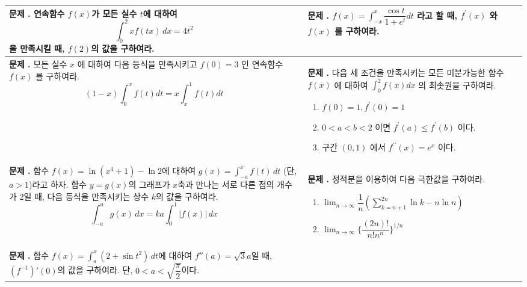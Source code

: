 \documentclass[10pt, a4paper]{article}
\newcounter{probcount}
\newcommand{\exercise}[1]{%
    \stepcounter{probcount}%
    \begin{minipage}[t][120mm][t]{0.44\textwidth}
        \small 
        \vspace{1mm}
        \noindent \textbf{문제 \arabic{probcount}.} #1
    \end{minipage}%
}
\begin{document}
\noindent
\begin{longtable}{p{} | p{}}
    
    \exercise{연속함수 $f(x)$가 모든 실수 $t$에 대하여 
\[ \int_{0}^{2} x f(tx) \, dx = 4t^2 \]
을 만족시킬 때, $f(2)$의 값을 구하여라.} 
    & 
    \exercise{$f(x) = \displaystyle \int_{-x}^{x} \dfrac{\cos t}{1+e^t} dt$ 라고 할 때, $f^{\prime}(x)$ 와 $f(x)$ 를 구하여라.} \\
    \hline 
    
    \exercise{모든 실수 $x$ 에 대하여 다음 등식을 만족시키고 $f(0)=3$ 인 연속함수 $f(x)$ 를 구하여라.
    \[ (1-x) \int_0^x f(t) dt = x \int_x^1 f(t) dt \]} 
    & 

    \exercise{다음 세 조건을 만족시키는 모든 미분가능한 함수 $f(x)$ 에 대하여 $\displaystyle \int_0^2 f(x) dx$ 의 최솟원을 구하여라.
    \begin{enumerate}[label=(\roman*), nosep]
        \item $f(0)=1, f^{\prime}(0)=1$
        \item $0 < a < b < 2$ 이면 $f^{\prime}(a) \le f^{\prime}(b)$ 이다.
        \item 구간 $(0, 1)$ 에서 $f^{\prime\prime}(x) = e^x$ 이다.
    \end{enumerate}} \\
    
    \exercise{함수 $f(x) = \ln(x^4 + 1) - \ln 2$에 대하여 $g(x) = \int_{-a}^{x} f(t) \, dt$ (단, $a > 1$)라고 하자. 함수 $y = g(x)$의 그래프가 $x$축과 만나는 서로 다른 점의 개수가 2일 때, 다음 등식을 만족시키는 상수 $k$의 값을 구하여라.
\[ \int_{-a}^{a} g(x) \, dx = ka \int_{0}^{1} |f(x)| \, dx \]} 
    &
    
    \exercise{정적분을 이용하여 다음 극한값을 구하여라.
    \begin{enumerate}[label=(\arabic*), leftmargin=8mm, nosep]
        \item $\displaystyle \lim_{n \to \infty} \dfrac{1}{n} (\sum_{k=n+1}^{2n} \ln k - n \ln n)$
        \item $\displaystyle \lim_{n \to \infty} \{ \dfrac{(2n)!}{n!n^n} \}^{1/n}$
    \end{enumerate}} \\
    \hline
    
    \exercise{함수 $f(x) = \int_{a}^{x} (2 + \sin t^2) \, dt$에 대하여 $f''(a) = \sqrt{3} a$일 때, $(f^{-1})'(0)$의 값을 구하여라. 단, $0 < a < \sqrt{\dfrac{\pi}{2}}$이다.} 
    &   


\end{longtable}
\end{document}
